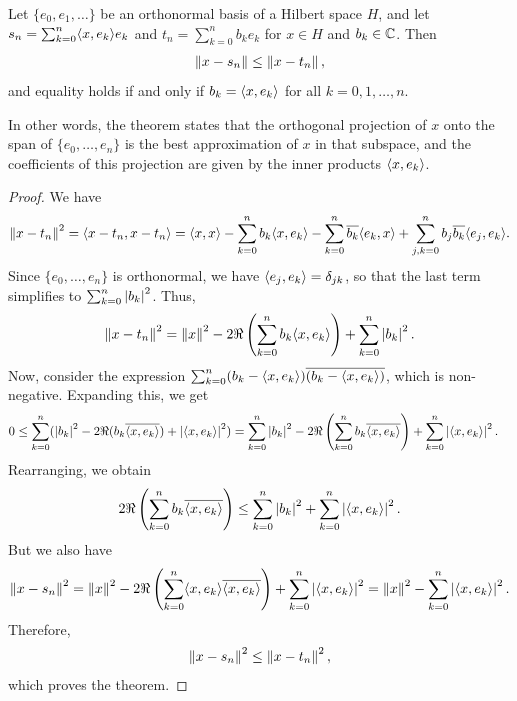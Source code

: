 \begin{theorem}
    Let $\{e_{0},e_{1},\ldots\}$ be an orthonormal basis of a Hilbert space $H$, and let $s_{n} = \sum_{k=0}^{n} \langle x,e_{k}\rangle e_{k}$ and $t_{n} = \sum_{k=0}^{n} b_{k} e_{k}$ for $x \in H$ and $b_{k} \in \mathbb{C}$. Then
    \begin{align}
        \left\lVert x-s_{n}\right\rVert \leq \left\lVert x-t_{n}\right\rVert,
    \end{align}
    and equality holds if and only if $b_{k} = \langle x,e_{k}\rangle$ for all $k = 0,1,\ldots,n$.
\end{theorem}
In other words, the theorem states that the orthogonal projection of $x$ onto the span of $\{e_{0},\ldots,e_{n}\}$ is the best approximation of $x$ in that subspace, and the coefficients of this projection are given by the inner products $\langle x,e_{k}\rangle$.

\begin{proof}
    We have
    \begin{align}
        \left\lVert x-t_{n}\right\rVert^{2} = \langle x-t_{n},x-t_{n}\rangle = \langle x,x\rangle - \sum_{k=0}^{n} b_{k}\langle x,e_{k}\rangle - \sum_{k=0}^{n} \overline{b_{k}}\langle e_{k},x\rangle + \sum_{j,k=0}^{n} b_{j}\overline{b_{k}}\langle e_{j},e_{k}\rangle.
    \end{align}
    Since $\{e_{0},\ldots,e_{n}\}$ is orthonormal, we have $\langle e_{j},e_{k}\rangle = \delta_{jk}$, so that the last term simplifies to $\sum_{k=0}^{n} \left| b_{k} \right|^{2}$. Thus,
    \begin{align}
        \left\lVert x-t_{n}\right\rVert^{2} = \left\lVert x\right\rVert^{2} - 2\Re\left(\sum_{k=0}^{n} b_{k}\langle x,e_{k}\rangle\right) + \sum_{k=0}^{n} \left| b_{k} \right|^{2}.
    \end{align}
    Now, consider the expression $\sum_{k=0}^{n} (b_{k}-\langle x,e_{k}\rangle)\overline{(b_{k}-\langle x,e_{k}\rangle)}$, which is non-negative. Expanding this, we get
    \begin{align}
        0 &\leq \sum_{k=0}^{n} (\left| b_{k} \right|^{2} - 2\Re(b_{k}\overline{\langle x,e_{k}\rangle}) + \left| \langle x,e_{k}\rangle \right|^{2}) = \sum_{k=0}^{n} \left| b_{k} \right|^{2} - 2\Re\left(\sum_{k=0}^{n} b_{k}\overline{\langle x,e_{k}\rangle}\right) + \sum_{k=0}^{n} \left| \langle x,e_{k}\rangle \right|^{2}.
    \end{align}
    Rearranging, we obtain
    \begin{align}
        2\Re\left(\sum_{k=0}^{n} b_{k}\overline{\langle x,e_{k}\rangle}\right) \leq \sum_{k=0}^{n} \left| b_{k} \right|^{2} + \sum_{k=0}^{n} \left| \langle x,e_{k}\rangle \right|^{2}.
    \end{align}
    But we also have
    \begin{align}
        \left\lVert x-s_{n}\right\rVert^{2} = \left\lVert x\right\rVert^{2} - 2\Re\left(\sum_{k=0}^{n} \langle x,e_{k}\rangle\overline{\langle x,e_{k}\rangle}\right) + \sum_{k=0}^{n} \left| \langle x,e_{k}\rangle \right|^{2} = \left\lVert x\right\rVert^{2} - \sum_{k=0}^{n} \left| \langle x,e_{k}\rangle \right|^{2}.
    \end{align}
    Therefore,
    \begin{align}
        \left\lVert x-s_{n}\right\rVert^{2} \leq \left\lVert x-t_{n}\right\rVert^{2},
    \end{align}
    which proves the theorem.
\end{proof}

